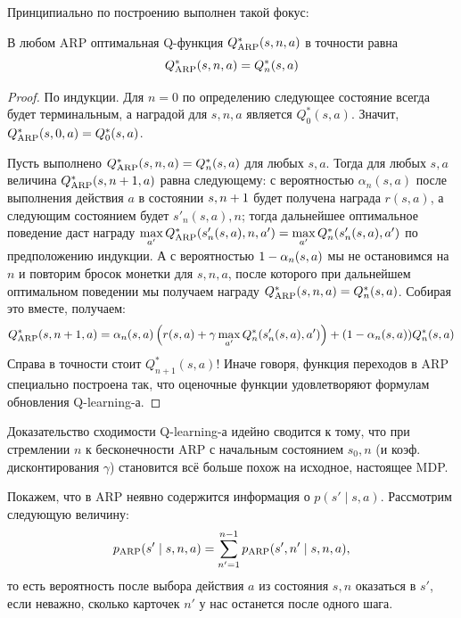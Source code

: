 Принципиально по построению выполнен такой фокус:
\begin{theorem}
В любом ARP оптимальная Q-функция $Q_{\mathrm{ARP}}^*(s, n, a)$ в точности равна
\begin{equation}\label{ARPQ}
Q_{\mathrm{ARP}}^*(s, n, a) = Q^*_n(s, a)
\end{equation}
\begin{proof}
По индукции. Для $n = 0$ по определению следующее состояние всегда будет терминальным, а наградой для $s, n, a$ является $Q^*_0(s, a)$. Значит, $Q_{\mathrm{ARP}}^*(s, 0, a) = Q^*_0(s, a)$.

Пусть выполнено $Q_{\ARP}^*(s, n, a) \HM= Q^*_n(s, a)$ для любых $s, a$. Тогда для любых $s, a$ величина $Q_{\ARP}^*(s, n \HM+ 1, a)$ равна следующему: с вероятностью $\alpha_n(s, a)$ после выполнения действия $a$ в состоянии $s, n \HM+ 1$ будет получена награда $r(s, a)$, а следующим состоянием будет $s'_n(s, a), n$; тогда дальнейшее оптимальное поведение даст награду $\max\limits_{a'} Q_{\ARP}^*(s'_n(s, a), n, a') \HM= \max\limits_{a'} Q^*_n(s'_n(s, a), a')$ по предположению индукции. А с вероятностью $1 \HM- \alpha_n(s, a)$ мы не остановимся на $n$ и повторим бросок монетки для $s, n, a$, после которого при дальнейшем оптимальном поведении мы получаем награду $Q^*_{\ARP}(s, n, a) \HM= Q^*_n(s, a)$. Собирая это вместе, получаем:
$$Q_{\mathrm{ARP}}^*(s, n + 1, a) = \alpha_n(s, a) \left( r(s, a) + \gamma \max_{a'} Q^*_n(s'_n(s, a), a') \right) + (1 - \alpha_n(s, a)) Q^*_n(s, a)$$
Справа в точности стоит $Q^*_{n+1}(s, a)$! Иначе говоря, функция переходов в ARP специально построена так, что оценочные функции удовлетворяют формулам обновления Q-learning-а.
\end{proof}
\end{theorem}

Доказательство сходимости Q-learning-а идейно сводится к тому, что при стремлении $n$ к бесконечности ARP с начальным состоянием $s_0, n$ (и коэф. дисконтирования $\gamma$) становится всё больше похож на исходное, настоящее MDP.

Покажем, что в ARP неявно содержится информация о $p(s' \mid s, a)$. Рассмотрим следующую величину:
$$p_{\mathrm{ARP}}(s' \mid s, n, a) = \sum_{n' = 1}^{n-1} p_{\mathrm{ARP}}(s', n' \mid s, n, a),$$
то есть вероятность после выбора действия $a$ из состояния $s, n$ оказаться в $s'$, если неважно, сколько карточек $n'$ у нас останется после одного шага.

